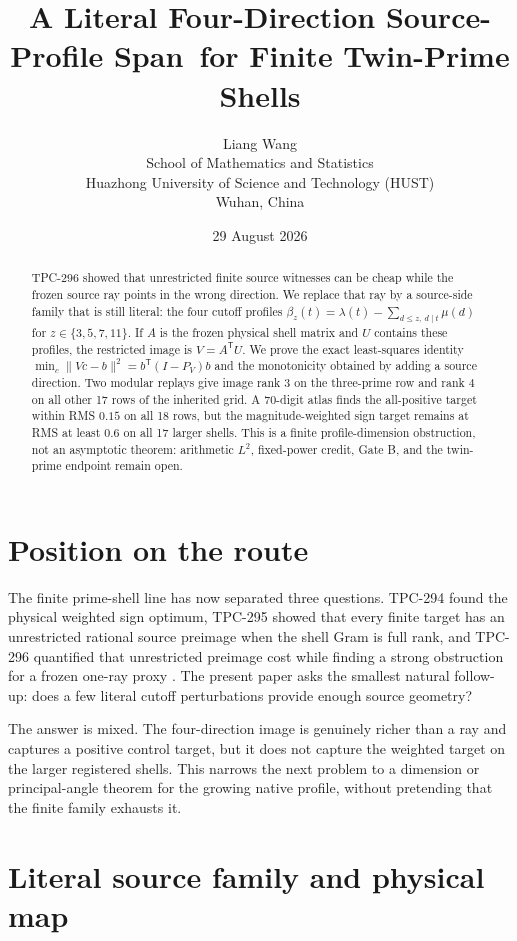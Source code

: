\documentclass[10pt]{article}
\title{A Literal Four-Direction Source-Profile Span\
for Finite Twin-Prime Shells}
\author{Liang Wang\\
School of Mathematics and Statistics\\
Huazhong University of Science and Technology (HUST)\\
Wuhan, China}
\date{29 August 2026}
\begin{document}
\maketitle

\begin{abstract}
TPC-296 showed that unrestricted finite source witnesses can be cheap while
the frozen source ray points in the wrong direction.  We replace that ray by
a source-side family that is still literal: the four cutoff profiles
$\beta_z(t)=\lambda(t)-\sum_{d\leq z,\ d\mid t}\mu(d)$ for
$z\in\{3,5,7,11\}$.  If $A$ is the frozen physical shell matrix and $U$
contains these profiles, the restricted image is $V=A^{\mathsf T}U$.
We prove the exact least-squares identity
$\min_c\|Vc-b\|^2=b^{\mathsf T}(I-P_V)b$ and the monotonicity obtained by
adding a source direction.  Two modular replays give image rank $3$ on the
three-prime row and rank $4$ on all other 17 rows of the inherited grid.
A 70-digit atlas finds the all-positive target within RMS $0.15$ on all 18
rows, but the magnitude-weighted sign target remains at RMS at least $0.6$
on all 17 larger shells.  This is a finite profile-dimension obstruction,
not an asymptotic theorem: arithmetic $L^2$, fixed-power credit, Gate B, and
the twin-prime endpoint remain open.
\end{abstract}

\section{Position on the route}

The finite prime-shell line has now separated three questions.  TPC-294
found the physical weighted sign optimum, TPC-295 showed that every finite
target has an unrestricted rational source preimage when the shell Gram is
full rank, and TPC-296 quantified that unrestricted preimage cost while
finding a strong obstruction for a frozen one-ray proxy
\cite{tpc295,tpc296}.  The present paper asks the smallest natural follow-up:
does a few literal cutoff perturbations provide enough source geometry?

The answer is mixed.  The four-direction image is genuinely richer than a
ray and captures a positive control target, but it does not capture the
weighted target on the larger registered shells.  This narrows the next
problem to a dimension or principal-angle theorem for the growing native
profile, without pretending that the finite family exhausts it.

\section{Literal source family and physical map}
\end{document}
